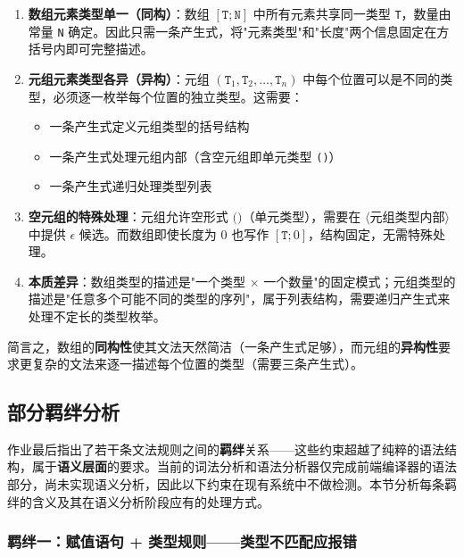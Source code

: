 \documentclass[12pt,a4paper]{ctexart}
\begin{document}
\begin{enumerate}
    \item \textbf{数组元素类型单一（同构）}：数组 $[\texttt{T}; \texttt{N}]$ 中所有元素共享同一类型 \texttt{T}，数量由常量 \texttt{N} 确定。因此只需一条产生式，将"元素类型"和"长度"两个信息固定在方括号内即可完整描述。

    \item \textbf{元组元素类型各异（异构）}：元组 $(\texttt{T}_1, \texttt{T}_2, \ldots, \texttt{T}_n)$ 中每个位置可以是不同的类型，必须逐一枚举每个位置的独立类型。这需要：
    \begin{itemize}
        \item 一条产生式定义元组类型的括号结构
        \item 一条产生式处理元组内部（含空元组即单元类型 \texttt{()}）
        \item 一条产生式递归处理类型列表
    \end{itemize}

    \item \textbf{空元组的特殊处理}：元组允许空形式 $\texttt{()}$（单元类型），需要在 $\langle\text{元组类型内部}\rangle$ 中提供 $\epsilon$ 候选。而数组即使长度为 0 也写作 $[\texttt{T}; 0]$，结构固定，无需特殊处理。

    \item \textbf{本质差异}：数组类型的描述是"一个类型 $\times$ 一个数量"的固定模式；元组类型的描述是"任意多个可能不同的类型的序列"，属于列表结构，需要递归产生式来处理不定长的类型枚举。
\end{enumerate}

简言之，数组的\textbf{同构性}使其文法天然简洁（一条产生式足够），而元组的\textbf{异构性}要求更复杂的文法来逐一描述每个位置的类型（需要三条产生式）。

\subsection{部分羁绊分析}

作业最后指出了若干条文法规则之间的\textbf{羁绊}关系——这些约束超越了纯粹的语法结构，属于\textbf{语义层面}的要求。当前的词法分析和语法分析器仅完成前端编译器的语法部分，尚未实现语义分析，因此以下约束在现有系统中不做检测。本节分析每条羁绊的含义及其在语义分析阶段应有的处理方式。

\subsubsection{羁绊一：赋值语句 + 类型规则——类型不匹配应报错}
\end{document}
